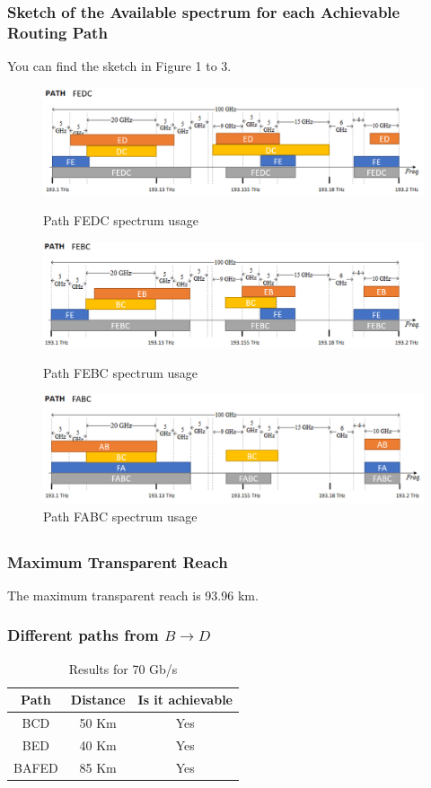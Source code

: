 \documentclass{article}
\begin{document}
\subsubsection{Sketch of the Available spectrum for each Achievable Routing Path}
You can find the sketch in Figure 1 to 3.


\begin{figure}[htb!]
    \centering
    \includegraphics[scale=0.5]{spectrum-path-fedc}
    \caption{Path FEDC spectrum usage}
    \includegraphics[scale=0.5]{spectrum-path-febc}
    \caption{Path FEBC spectrum usage}
    \includegraphics[scale=0.5]{spectrum-path-fabc}
    \caption{Path FABC spectrum usage}
\end{figure}

\subsection{}
\subsubsection{Maximum Transparent Reach}

The maximum transparent reach is 93.96 km.

\subsubsection{Different paths from $B \to D$}
\begin{table}[htb!]
    \centering
    \begin{tabular}{|c|c|c|}
    \hline
         Path & Distance & Is it achievable \\ \hline
         BCD & 50 Km & Yes \\ \hline
         BED & 40 Km & Yes \\ \hline
         BAFED & 85 Km & Yes\\ \hline

    \end{tabular}
    \caption{Results for 70 Gb/s}
\end{table}
\end{document}
